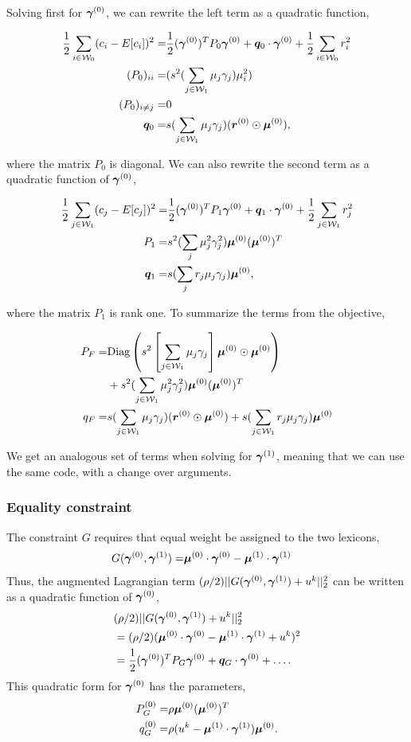 Solving first for $\bm{\gamma}^{(0)}$, we can rewrite the left term as a quadratic function,
\begin{small}
\begin{align}
\frac{1}{2}\sum_{i\in {\ensuremath{\mathcal{W}}}_0}(c_i - E[c_i])^2 = & \frac{1}{2} (\bm{\gamma}^{(0)})^T P_0 \bm{\gamma}^{(0)} + \bm{q}_0 \cdot \bm{\gamma}^{(0)} + \frac{1}{2} \sum_{i\in {\ensuremath{\mathcal{W}}}_0}r^2_i\\
(P_0)_{ii} = & (s^2 (\sum_{j\in {\ensuremath{\mathcal{W}}}_1} \mu_j \gamma_j ) \mu_i^2) \\
(P_0)_{i\neq j}=& 0 \\
\bm{q}_0 = & s (\sum_{j\in {\ensuremath{\mathcal{W}}}_1} \mu_j \gamma_j) (\bm{r}^{(0)} \odot \bm{\mu}^{(0)}),
\end{align}
\end{small}
where the matrix $P_0$ is diagonal. We can also rewrite the second term as a quadratic function of $\bm{\gamma}^{(0)}$,
\begin{small}\begin{align}
\frac{1}{2}\sum_{j\in {\ensuremath{\mathcal{W}}}_1}(c_j - E[c_j])^2 = & \frac{1}{2} (\bm{\gamma}^{(0)})^T P_1 \bm{\gamma}^{(0)} + \bm{q}_1 \cdot \bm{\gamma}^{(0)} + \frac{1}{2} \sum_{j\in {\ensuremath{\mathcal{W}}}_1}r^2_j\\
P_1 = & s^2 (\sum_j \mu_j^2 \gamma_j^2) \bm{\mu}^{(0)} (\bm{\mu}^{(0)})^T\\
\bm{q}_1 = & s (\sum_j r_j \mu_j \gamma_j) \bm{\mu}^{(0)},
\end{align}
\end{small}
where the matrix $P_1$ is rank one. To summarize the terms from the objective,
\begin{small}
\begin{align}
\notag
P_F = & \text{Diag}\left(s^2 \left[ \sum_{j\in {\ensuremath{\mathcal{W}}}_1} \mu_j \gamma_j \right] \bm{\mu}^{(0)} \odot \bm{\mu}^{(0)}\right)\\
& + s^2 (\sum_{j\in {\ensuremath{\mathcal{W}}}_1} \mu_j^2 \gamma_j^2) \bm{\mu}^{(0)} (\bm{\mu}^{(0)})^T\\
q_F = & s (\sum_{j\in {\ensuremath{\mathcal{W}}}_1} \mu_j \gamma_j) (\bm{r}^{(0)} \odot \bm{\mu}^{(0)}) + s (\sum_{j\in {\ensuremath{\mathcal{W}}}_1} r_j \mu_j \gamma_j) \bm{\mu}^{(0)}
\end{align}
\end{small}
We get an analogous set of terms when solving for $\bm{\gamma}^{(1)}$, meaning that we can use the same code, with a change over arguments.

\subsubsection{Equality constraint}
The constraint $G$ requires that equal weight be assigned to the two lexicons,
\begin{align}
G(\bm{\gamma}^{(0)},\bm{\gamma}^{(1)}) = & \bm{\mu}^{(0)} \cdot \bm{\gamma}^{(0)} - \bm{\mu}^{(1)} \cdot \bm{\gamma}^{(1)}
\end{align}
Thus, the augmented Lagrangian term $(\rho/2)||G(\bm{\gamma}^{(0)},\bm{\gamma}^{(1)}) + u^k||_2^2$ can be written as a quadratic function of $\bm{\gamma}^{(0)}$,
\begin{align}
\notag
& (\rho/2)||G(\bm{\gamma}^{(0)},\bm{\gamma}^{(1)}) + u^k||_2^2\\
& = (\rho/2)(\bm{\mu}^{(0)} \cdot \bm{\gamma}^{(0)} - \bm{\mu}^{(1)} \cdot \bm{\gamma}^{(1)} + u^k)^2\\
& = \frac{1}{2} (\bm{\gamma}^{(0)})^T P_G \bm{\gamma}^{(0)} + \bm{q}_G \cdot \bm{\gamma}^{(0)} + \ldots.
\end{align}
This quadratic form for $\bm{\gamma}^{(0)}$ has the parameters,
\begin{align}
P^{(0)}_G = & \rho \bm{\mu}^{(0)} (\bm{\mu}^{(0)})^T\\
q^{(0)}_G = & \rho (u^k - \bm{\mu}^{(1)} \cdot \bm{\gamma}^{(1)} ) \bm{\mu}^{(0)}.
\end{align}

